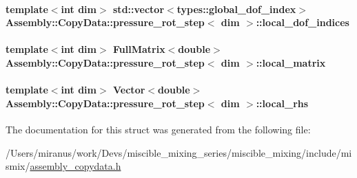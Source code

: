 \paragraph[{local\+\_\+dof\+\_\+indices}]{\setlength{\rightskip}{0pt plus 5cm}template$<$int dim$>$ std\+::vector$<$types\+::global\+\_\+dof\+\_\+index$>$ {\bf Assembly\+::\+Copy\+Data\+::pressure\+\_\+rot\+\_\+step}$<$ dim $>$\+::local\+\_\+dof\+\_\+indices}\label{struct_assembly_1_1_copy_data_1_1pressure__rot__step_ade1a65d97b3092835d27a4cd6295482f}
\hypertarget{struct_assembly_1_1_copy_data_1_1pressure__rot__step_a316a4598a7bed63334bcb4699469f366}{}
\paragraph[{local\+\_\+matrix}]{\setlength{\rightskip}{0pt plus 5cm}template$<$int dim$>$ Full\+Matrix$<$double$>$ {\bf Assembly\+::\+Copy\+Data\+::pressure\+\_\+rot\+\_\+step}$<$ dim $>$\+::local\+\_\+matrix}\label{struct_assembly_1_1_copy_data_1_1pressure__rot__step_a316a4598a7bed63334bcb4699469f366}
\hypertarget{struct_assembly_1_1_copy_data_1_1pressure__rot__step_a43d09c97e5a67574fd254c7539b8d439}{}
\paragraph[{local\+\_\+rhs}]{\setlength{\rightskip}{0pt plus 5cm}template$<$int dim$>$ Vector$<$double$>$ {\bf Assembly\+::\+Copy\+Data\+::pressure\+\_\+rot\+\_\+step}$<$ dim $>$\+::local\+\_\+rhs}\label{struct_assembly_1_1_copy_data_1_1pressure__rot__step_a43d09c97e5a67574fd254c7539b8d439}


The documentation for this struct was generated from the following file\+:\begin{DoxyCompactItemize}
\item 
/\+Users/miranus/work/\+Devs/miscible\+\_\+mixing\+\_\+series/miscible\+\_\+mixing/include/mismix/\hyperlink{assembly__copydata_8h}{assembly\+\_\+copydata.\+h}\end{DoxyCompactItemize}
